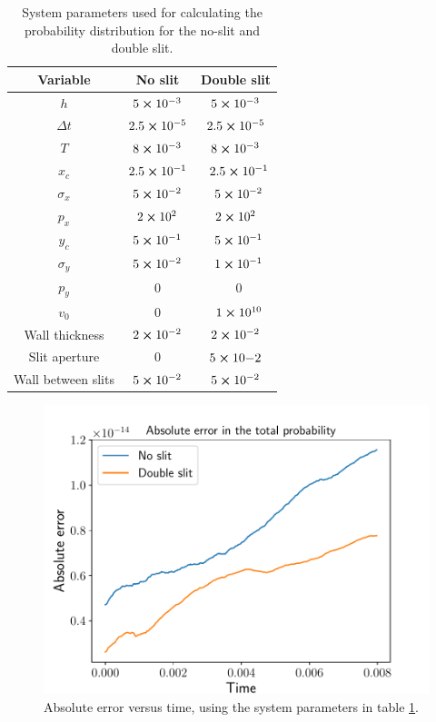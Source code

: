 \documentclass[english,notitlepage,reprint,nofootinbib]{revtex4-2}  %
\begin{document}
	\begin{table}
	\centering
	\caption{System parameters used for calculating the probability distribution for the no-slit and double slit.}
	\label{tab:1}
	\begin{tabular}{c  c  c} %
	 Variable& No slit & Double slit\\
	\hline
	$h$                & $5\cross10^{-3}$                &\quad $5\cross10^{-3}$   \\
	$\Delta t$       & $2.5\cross10^{-5}$            &\quad $2.5\cross10^{-5}$  \\
	$T$                & $8\cross10^{-3}$               &\quad $8\cross10^{-3}$     \\
	$x_c$             & $2.5\cross10^{-1}$            &\quad $2.5\cross10^{-1}$  \\
	$\sigma_x$    & $5\cross10^{-2}$               &\quad $5\cross10^{-2}$     \\
	$p_x$             & $2\cross10^{2}$                &\quad $2\cross10^{2}$      \\
	$y_c$             & $5\cross10^{-1}$               &\quad $5\cross10^{-1}$     \\
	$\sigma_y$    & $5\cross10^{-2}$               &\quad $1\cross10^{-1}$     \\
	$p_y$             & $0$                                    &\quad $0$                         \\
	$v_0$             & $0$                                    &\quad $1\cross10^{10}$    \\
	Wall thickness      & $2\cross10^{-2}$               & $2\cross10^{-2}$        \\
	Slit aperture          & $0$                                     & $5\cross10{-2}$        \\
	Wall between slits & $5\cross10^{-2}$          & $5\cross10^{-2}$            \\
	\hline
	\end{tabular}
	\end{table}		\begin{figure}[H]
		\centering
		\includegraphics[scale=0.55]{figures/problem7_error.pdf}
		\caption{Absolute error versus time, using the system parameters in table \ref{tab:1}.}
		\label{fig:prob7_error}
	\end{figure}
\end{document}
